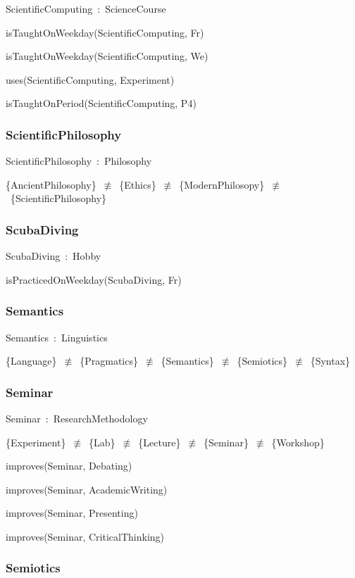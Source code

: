 \documentclass{article}
\begin{document}
ScientificComputing~:~ScienceCourse

isTaughtOnWeekday(ScientificComputing, Fr)

isTaughtOnWeekday(ScientificComputing, We)

uses(ScientificComputing, Experiment)

isTaughtOnPeriod(ScientificComputing, P4)

\subsubsection*{ScientificPhilosophy}

ScientificPhilosophy~:~Philosophy

\{AncientPhilosophy\}~\ensuremath{\not\equiv}~\{Ethics\}~\ensuremath{\not\equiv}~\{ModernPhilosopy\}~\ensuremath{\not\equiv}~\{ScientificPhilosophy\}

\subsubsection*{ScubaDiving}

ScubaDiving~:~Hobby

isPracticedOnWeekday(ScubaDiving, Fr)

\subsubsection*{Semantics}

Semantics~:~Linguistics

\{Language\}~\ensuremath{\not\equiv}~\{Pragmatics\}~\ensuremath{\not\equiv}~\{Semantics\}~\ensuremath{\not\equiv}~\{Semiotics\}~\ensuremath{\not\equiv}~\{Syntax\}

\subsubsection*{Seminar}

Seminar~:~ResearchMethodology

\{Experiment\}~\ensuremath{\not\equiv}~\{Lab\}~\ensuremath{\not\equiv}~\{Lecture\}~\ensuremath{\not\equiv}~\{Seminar\}~\ensuremath{\not\equiv}~\{Workshop\}

improves(Seminar, Debating)

improves(Seminar, AcademicWriting)

improves(Seminar, Presenting)

improves(Seminar, CriticalThinking)

\subsubsection*{Semiotics}
\end{document}
